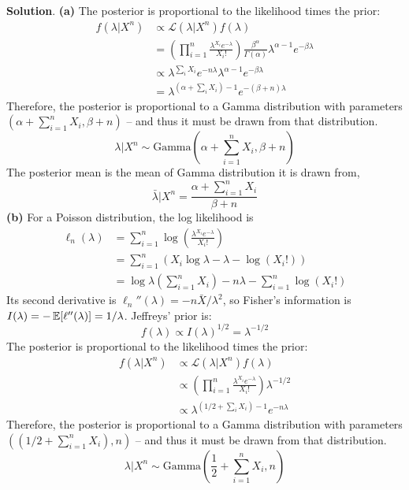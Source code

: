 \textbf{Solution}.
\textbf{(a)} The posterior is proportional to the likelihood times the
prior:
\begin{align*}
f(\lambda | X^{n}) &\propto \mathcal{L}(\lambda | X^{n}) f(\lambda) \\
&= \left(\prod_{i=1}^{n} \frac{\lambda^{X_{i}}e^{-\lambda}}{X_{i}!} \right) \frac{\beta^{\alpha}}{\Gamma(\alpha)}\lambda^{\alpha - 1}e^{-\beta \lambda} \\
& \propto \lambda^{\sum_{i} X_{i}} e^{-n\lambda} \lambda^{\alpha - 1}e^{-\beta \lambda} \\
&= \lambda^{\left(\alpha + \sum_{i} X_{i} \right) - 1} e^{-(\beta + n) \lambda}
\end{align*}
Therefore, the posterior is proportional to a Gamma distribution with
parameters \(\left(\alpha + \sum_{i=1}^{n} X_{i}, \beta + n\right)\) -- and
thus it must be drawn from that distribution.
\[
\lambda | X^{n} \sim \text{Gamma}\left(\alpha + \sum_{i=1}^{n} X_{i}, \beta + n \right)
\]
The posterior mean is the mean of Gamma distribution it is drawn from,
\[
\bar{\lambda} | X^{n} = \frac{\alpha + \sum_{i=1}^{n} X_{i}}{\beta + n}
\]
\textbf{(b)} For a Poisson distribution, the log likelihood is
\begin{align*}
\ell_{n}(\lambda) &= \sum_{i=1}^{n} \log \left( \frac{\lambda^{X_{i}} e^{-\lambda}}{X_{i}!}\right)  \\
&= \sum_{i=1}^{n} \left( X_{i} \log \lambda - \lambda - \log (X_{i}!)\right) \\
&= \log \lambda \left( \sum_{i=1}^{n} X_{i} \right) - n\lambda - \sum_{i=1}^{n} \log (X_{i}!)
\end{align*}
Its second derivative is
\(\ell_{n}''(\lambda) = -n \bar{X} / \lambda^{2}\), so Fisher's
information is
\(I(\lambda) = -\operatorname{\mathbb{E}}[\ell''(\lambda)] = 1 / \lambda\).
Jeffreys' prior is:
\[
f(\lambda) \propto I(\lambda)^{1/2} = \lambda^{-1/2}
\]
The posterior is proportional to the likelihood times the prior:
\begin{align*}
f(\lambda | X^{n}) &\propto \mathcal{L}(\lambda | X^{n}) f(\lambda) \\
&\propto \left(\prod_{i=1}^{n} \frac{\lambda^{X_{i}}e^{-\lambda}}{X_{i}!} \right) \lambda^{-1/2} \\
&\propto \lambda^{\left(1/2 + \sum_{i} X_{i} \right) - 1} e^{-n\lambda}
\end{align*}
Therefore, the posterior is proportional to a Gamma distribution with
parameters \(\left(\left(1/2 + \sum_{i=1}^{n} X_{i} \right), n\right)\) --
and thus it must be drawn from that distribution.
\[
\lambda | X^{n} \sim \text{Gamma}\left(\frac{1}{2} + \sum_{i=1}^{n} X_{i}, n \right)
\]
